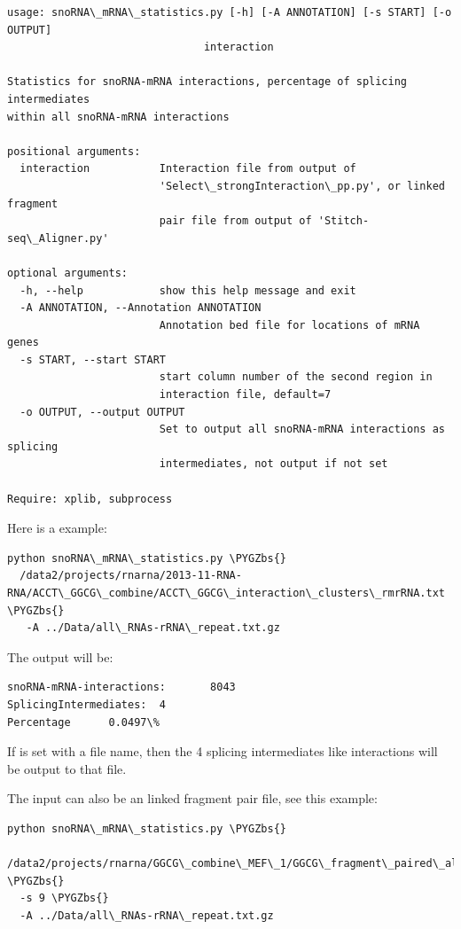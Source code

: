 \documentclass[letterpaper,10pt,english]{sphinxmanual}
\def\PYGZbs{\char`\\}
\begin{document}
\begin{Verbatim}[commandchars=\\\{\}]
usage: snoRNA\_mRNA\_statistics.py [-h] [-A ANNOTATION] [-s START] [-o OUTPUT]
                               interaction

Statistics for snoRNA-mRNA interactions, percentage of splicing intermediates
within all snoRNA-mRNA interactions

positional arguments:
  interaction           Interaction file from output of
                        'Select\_strongInteraction\_pp.py', or linked fragment
                        pair file from output of 'Stitch-seq\_Aligner.py'

optional arguments:
  -h, --help            show this help message and exit
  -A ANNOTATION, --Annotation ANNOTATION
                        Annotation bed file for locations of mRNA genes
  -s START, --start START
                        start column number of the second region in
                        interaction file, default=7
  -o OUTPUT, --output OUTPUT
                        Set to output all snoRNA-mRNA interactions as splicing
                        intermediates, not output if not set

Require: xplib, subprocess
\end{Verbatim}

Here is a example:

\begin{Verbatim}[commandchars=\\\{\}]
python snoRNA\_mRNA\_statistics.py \PYGZbs{}
  /data2/projects/rnarna/2013-11-RNA-RNA/ACCT\_GGCG\_combine/ACCT\_GGCG\_interaction\_clusters\_rmrRNA.txt \PYGZbs{}
   -A ../Data/all\_RNAs-rRNA\_repeat.txt.gz
\end{Verbatim}

The output will be:

\begin{Verbatim}[commandchars=\\\{\}]
snoRNA-mRNA-interactions:       8043
SplicingIntermediates:  4
Percentage      0.0497\%
\end{Verbatim}

If  is set with a file name, then the 4 splicing intermediates like interactions will be output to that file.

The input can also be an linked fragment pair file, see this example:

\begin{Verbatim}[commandchars=\\\{\}]
python snoRNA\_mRNA\_statistics.py \PYGZbs{}
  /data2/projects/rnarna/GGCG\_combine\_MEF\_1/GGCG\_fragment\_paired\_align\_rmSingleFragment.txt \PYGZbs{}
  -s 9 \PYGZbs{}
  -A ../Data/all\_RNAs-rRNA\_repeat.txt.gz
\end{Verbatim}
\end{document}
